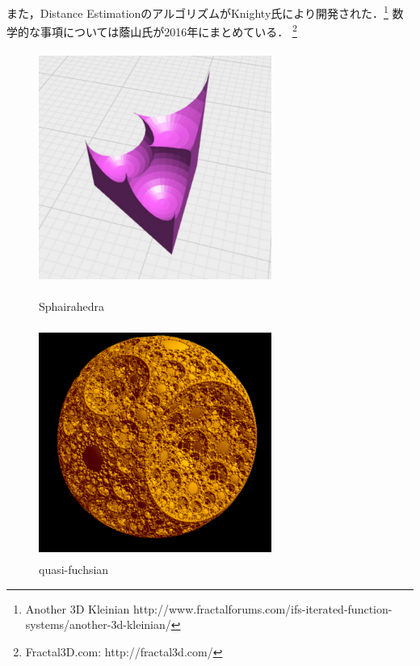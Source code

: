 また，Distance EstimationのアルゴリズムがKnighty氏により開発された．\footnote{Another 3D Kleinian http://www.fractalforums.com/ifs-iterated-function-systems/another-3d-kleinian/}
数学的な事項については蔭山氏が2016年にまとめている\cite{kageyama}．
\footnote{Fractal3D.com: http://fractal3d.com/}
\begin{figure}[htbp]
 \begin{minipage}{0.49\hsize}
  \begin{center}
   \includegraphics[width=3in, height=3in, keepaspectratio]{../img/klein/sphairahedra.pdf}
   \caption{Sphairahedra}
   \label{fig:sphairahedra}
  \end{center}
 \end{minipage}
 \begin{minipage}{0.49\hsize}
  \begin{center}
   \includegraphics[width=3in, height=3in, keepaspectratio]{../img/klein/quasi-fuchsian.pdf}
   \caption{quasi-fuchsian}
   \label{fig:quasiFuchsian}
  \end{center}
 \end{minipage}
\end{figure}

